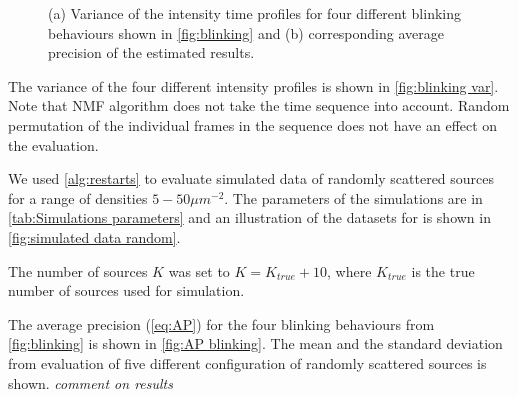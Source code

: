 \begin{figure}[!h]
	\centering
	\newcommand{\sizefig}{.40}
	\caption{(a) Variance of the intensity time profiles for four different blinking behaviours shown in \autoref{fig:blinking} and (b) corresponding average precision of the estimated results.}		
\end{figure}

The variance of the four different intensity profiles is shown in \autoref{fig:blinking var}. Note that NMF algorithm does not take the time sequence into account. Random permutation of the individual frames in the sequence does not have an effect on the evaluation.

We used \autoref{alg:restarts} to evaluate simulated data of randomly scattered sources for a range of densities $5-50\unit{\mu m^{-2}}$. The parameters of the simulations are in \autoref{tab:Simulations parameters} and an illustration of the datasets for is shown  in \autoref{fig:simulated data random}. 

The number of sources $K$ was set to $K=K_{true}+10$, where $K_{true}$ is the true number of sources used for simulation. 


The average precision (\autoref{eq:AP}) for the four blinking behaviours from \autoref{fig:blinking} is shown in \autoref{fig:AP blinking}. The mean and the standard deviation from evaluation of five different configuration of randomly scattered sources is shown. 
\fix
\emph{comment on results}

